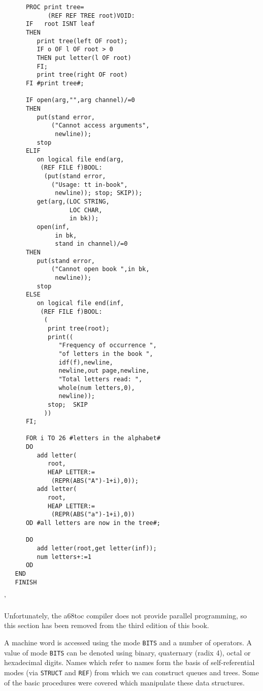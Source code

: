 \begin{exercise}
\begin{verbatim}
      PROC print tree=
            (REF REF TREE root)VOID:
      IF   root ISNT leaf
      THEN
         print tree(left OF root);
         IF o OF l OF root > 0
         THEN put letter(l OF root)
         FI;
         print tree(right OF root)
      FI #print tree#;

      IF open(arg,"",arg channel)/=0
      THEN
         put(stand error,
             ("Cannot access arguments",
              newline));
         stop
      ELIF
         on logical file end(arg,
          (REF FILE f)BOOL:
           (put(stand error,
             ("Usage: tt in-book",
              newline)); stop; SKIP));
         get(arg,(LOC STRING,
                  LOC CHAR,
                  in bk));
         open(inf,
              in bk,
              stand in channel)/=0
      THEN
         put(stand error,
             ("Cannot open book ",in bk,
              newline));
         stop
      ELSE
         on logical file end(inf,
          (REF FILE f)BOOL:
           (
            print tree(root);
            print((
               "Frequency of occurrence ",
               "of letters in the book ",
               idf(f),newline,
               newline,out page,newline,
               "Total letters read: ",
               whole(num letters,0),
               newline));
            stop;  SKIP
           ))
      FI;

      FOR i TO 26 #letters in the alphabet#
      DO
         add letter(
            root,
            HEAP LETTER:=
             (REPR(ABS("A")-1+i),0));
         add letter(
            root,
            HEAP LETTER:=
             (REPR(ABS("a")-1+i),0))
      OD #all letters are now in the tree#;

      DO
         add letter(root,get letter(inf));
         num letters+:=1
      OD
   END
   FINISH
\end{verbatim}
'
\end{exercise}

Unfortunately, the a68toc compiler does not provide parallel
programming, so this section has been removed from the third edition of
this book.

A machine word is accessed using the mode \verb|BITS| and a number of
operators. A value of mode \verb|BITS| can be denoted using binary,
quaternary (radix 4), octal or hexadecimal digits.  Names which refer
to names form the basis of self-referential modes (via \verb|STRUCT|
and \verb|REF|) from which we can construct queues and trees.  Some of
the basic procedures were covered which manipulate these data
structures.
